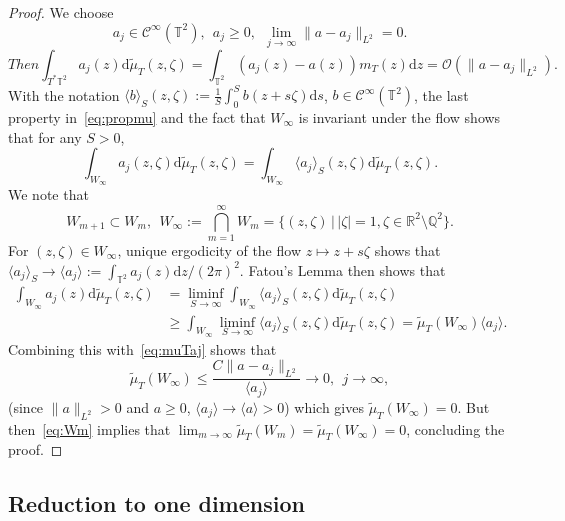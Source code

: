 \documentclass[AHL, Unicode, longabstracts]{cedram}
\newcommand{\CI}{{\mathcal C}^\infty }
\newcommand{\R}{{\mathbb R}}
\newcommand{\TT}{{\mathbb T}}
\newcommand{\TT}{{\mathbb T}}
\newcommand{\R}{{\mathbb R}}
\newcommand*{\dd}{\mathrm{d}}
\newcommand*{\dz}{\dd z}
\newcommand*{\ds}{\dd s}
\newcommand*{\dwmu}{\dd \widetilde\mu}
\newcommand*{\tq}{\,|\,}
\begin{document}
\begin{proof}
We choose
\begin{equation}\label{eq:aj}
a_j \in \CI (\TT^2), \ \ a_j \geq 0, \ \
\lim_{ j \to \infty } \| a - a_j\|_{L^2 } = 0.
\end{equation}
\begin{equation}
Then\label{eq:muTaj}
\int_{T^* \TT^2 } a_j (z) \dwmu_T (z,\zeta) = \int_{ \TT^2 } (a_j (z) - a (z)) m_T (z) \dz = \mathcal O (\| a - a_j \|_{L^2 }).
\end{equation}
With the notation $ \langle b \rangle_S (z, \zeta) := \frac{1}{S} \int_{ 0}^S b (z + s \zeta) \ds $, $ b \in \CI (\TT^2) $, the last property in~\eqref{eq:propmu} and the fact that $ W_\infty $ is invariant under the flow shows that for any $ S > 0 $,
\[
\int_{W_\infty } a_j (z,\zeta) \dwmu_T (z,\zeta) =
\int_{W_\infty } \langle a_j \rangle_S (z, \zeta) \dwmu_T (z,\zeta).
\]
We note that
\begin{equation}\label{eq:Wm}
W_{m+1} \subset W_m, \ \ W_\infty := \bigcap_{ m =1}^\infty W_m = \{(z, \zeta) \tq |\zeta|=1,
\zeta \in \R^2 \setminus \mathbb Q^2 \}.
\end{equation}
For $ (z, \zeta) \in W_\infty $, unique ergodicity of the flow $ z \mapsto z + s \zeta $ shows that $ \langle a_j \rangle_S \to \langle a_j
\rangle := \int_{\TT^2} a_j (z) \dz / (2 \pi)^2. $ Fatou's Lemma then shows that
\[
\begin{split} \int_{W_\infty } a_j (z) \dwmu_T (z,\zeta)
& = \liminf_{ S \to \infty } \int_{W_\infty } \langle a_j \rangle_S (z, \zeta) \dwmu_T (z,\zeta) \\
& \geq \int_{W_\infty} \liminf_{ S \to \infty } \langle a_j \rangle_S (z, \zeta) \dwmu_T (z,\zeta) = \widetilde \mu_T (W_\infty) \langle a_j \rangle.
\end{split}
\]
Combining this with~\eqref{eq:muTaj} shows that
\[
\widetilde \mu_T (W_\infty) \leq \frac{ C \| a - a_j \|_{L^2 } } {\langle a_j \rangle} \rightarrow 0, \ \ j \to \infty,
\]
(since $ \| a \|_{L^2 } > 0 $ and $ a \geq 0 $, $ \langle a_j \rangle
\to \langle a \rangle > 0 $) which gives $ \widetilde \mu_T (W_\infty) = 0 $. But then~\eqref{eq:Wm} implies that $ \lim_{ m \to \infty } \widetilde \mu_T (W_m) = \widetilde \mu_T (W_\infty) = 0 $, concluding the proof.
\end{proof}

\subsection{Reduction to one dimension}
\end{document}
